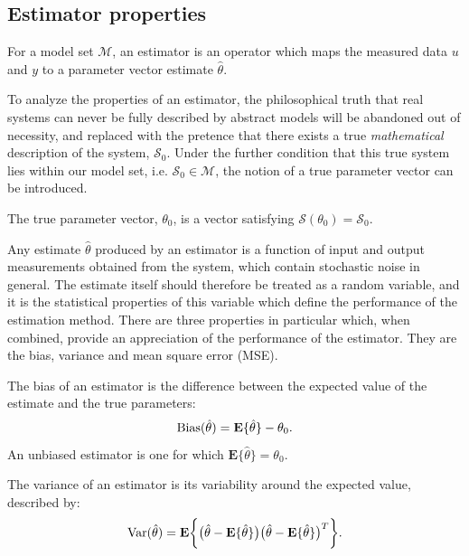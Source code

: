 \subsection{Estimator properties}

\begin{defn}[Estimator]
For a model set $\mathcal{M}$, an estimator is an operator which maps the measured data $u$ and $y$ to a parameter vector estimate $\hat{\theta}$. 
\end{defn}
To analyze the properties of an estimator, the philosophical truth that real systems can never be fully described by abstract models will be abandoned out of necessity, and replaced with the pretence that there exists a true \emph{mathematical} description of the system, $\mathcal{S}_0$. Under the further condition that this true system lies within our model set, i.e. $\mathcal{S}_0 \in \mathcal{M}$, the notion of a true parameter vector can be introduced.
\begin{defn}
The true parameter vector, $\theta_0$, is a vector satisfying $\mathcal{S}(\theta_0) = \mathcal{S}_0$.
\end{defn}

Any estimate $\hat{\theta}$ produced by an estimator is a function of input and output measurements obtained from the system, which contain stochastic noise in general. The estimate itself should therefore be treated as a random variable, and it is the statistical properties of this variable which define the performance of the estimation method. There are three properties in particular which, when combined, provide an appreciation of the performance of the estimator. They are the bias, variance and mean square error (MSE).

\begin{defn}[Bias]
The bias of an estimator is the difference between the expected value of the estimate and the true parameters:
\begin{equation}
\operatorname{Bias}(\hat{\theta}) = \textbf{E}\{ \hat{\theta} \} - \theta_0.
\end{equation}
An unbiased estimator is one for which $\textbf{E}\{ \hat{\theta} \} = \theta_0$.
\end{defn}

\begin{defn}[Variance]
The variance of an estimator is its variability around the expected value, described by:
\begin{equation}
\operatorname{Var}(\hat{\theta}) =  \textbf{E} \bigg\{ \big( \hat{\theta} - \textbf{E}\{ \hat{\theta} \} \big) \big( \hat{\theta} - \textbf{E}\{ \hat{\theta} \} \big)^T \bigg\}.
\end{equation}
\end{defn}

